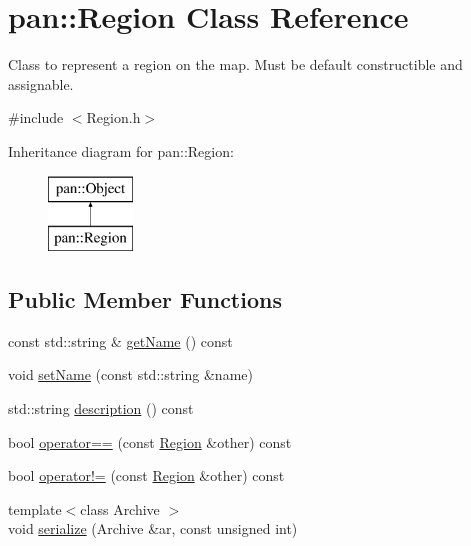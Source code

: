 \hypertarget{classpan_1_1_region}{}\section{pan\+:\+:Region Class Reference}
\label{classpan_1_1_region}


Class to represent a region on the map. Must be default constructible and assignable.  




{\ttfamily \#include $<$Region.\+h$>$}

Inheritance diagram for pan\+:\+:Region\+:\begin{figure}[H]
\begin{center}
\leavevmode
\includegraphics[height=2.000000cm]{classpan_1_1_region}
\end{center}
\end{figure}
\subsection*{Public Member Functions}
\begin{DoxyCompactItemize}
\item 
const std\+::string \& \hyperlink{classpan_1_1_region_a7ebfab047a556e5c95f9a7ea10eb71ba}{get\+Name} () const
\item 
void \hyperlink{classpan_1_1_region_a0138c13e4ba5d07029dd9bb641c8b1ef}{set\+Name} (const std\+::string \&name)
\item 
std\+::string \hyperlink{classpan_1_1_region_abc67a788365510bfad231939713106cb}{description} () const
\item 
bool \hyperlink{classpan_1_1_region_a6f65b58194c83c1c1ec666c6b14c983e}{operator==} (const \hyperlink{classpan_1_1_region}{Region} \&other) const
\item 
bool \hyperlink{classpan_1_1_region_aab9e2291f838d7cf87b2518fa2c1b8a0}{operator!=} (const \hyperlink{classpan_1_1_region}{Region} \&other) const
\item 
{\footnotesize template$<$class Archive $>$ }\\void \hyperlink{classpan_1_1_region_af273dea05ea12be85b8bcdec0e3c22d2}{serialize} (Archive \&ar, const unsigned int)
\end{DoxyCompactItemize}
